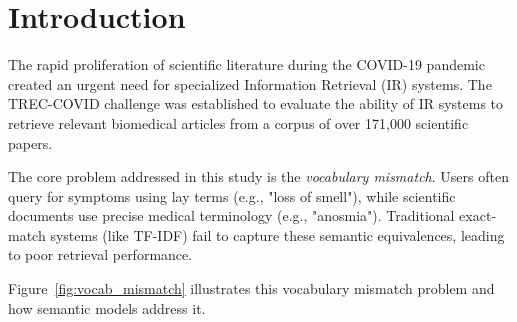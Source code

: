 \documentclass[sigconf,nonacm]{acmart}
\begin{document}


\maketitle


\section{Introduction}
The rapid proliferation of scientific literature during the COVID-19 pandemic created an urgent need for specialized Information Retrieval (IR) systems. The TREC-COVID challenge \cite{vorhees2021trec} was established to evaluate the ability of IR systems to retrieve relevant biomedical articles from a corpus of over 171,000 scientific papers.

The core problem addressed in this study is the \textit{vocabulary mismatch}. Users often query for symptoms using lay terms (e.g., "loss of smell"), while scientific documents use precise medical terminology (e.g., "anosmia"). Traditional exact-match systems (like TF-IDF) fail to capture these semantic equivalences, leading to poor retrieval performance.

Figure~\ref{fig:vocab_mismatch} illustrates this vocabulary mismatch problem and how semantic models address it.
\end{document}
